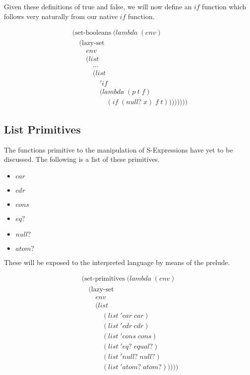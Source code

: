 Given these definitions of true and false, we will now define an $if$ 
function which follows very naturally from our native $if$ function.

\begin{figure}[htp]
\footnotesize
\caption{}\label{fig:preludeIfDef}
\begin{align*}
& (\text{set-booleans} \; (lambda \; (env) \; 
\\& \quad (\text{lazy-set} \; 
\\& \qquad env
\\& \qquad (list \; 
\\& \qquad \quad \dots
\\& \qquad \quad (list
\\& \qquad \qquad 'if \; 
\\& \qquad \qquad (lambda \; (p \; t \; f)
\\& \qquad \qquad \quad (if \; (null? \; x) \; f \; t))))))))
\end{align*}
\end{figure}

\subsection{List Primitives}
The functions primitive to the manipulation of S-Expressions have yet to be 
discussed. The following is a list of these primitives.

\begin{itemize}
  \item $car$
  \item $cdr$
  \item $cons$
  \item $eq?$
  \item $null?$
  \item $atom?$
\end{itemize}

These will be exposed to the interpreted language by means of the prelude.

\begin{figure}[htp]
\footnotesize
\caption{}\label{fig:preludePrimitives}
\begin{align*}
& (\text{set-primitives} \; (lambda \; (env)
\\& \quad (\text{lazy-set}
\\& \qquad env
\\& \qquad (list
\\& \qquad \quad (list \; 'car \; car)
\\& \qquad \quad (list \; 'cdr \; cdr)
\\& \qquad \quad (list \; 'cons \; cons)
\\& \qquad \quad (list \; 'eq? \; equal?)
\\& \qquad \quad (list \; 'null? \; null?)
\\& \qquad \quad (list \; 'atom? \; atom?)))))
\end{align*}
\end{figure}

